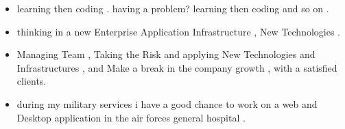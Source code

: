 \documentclass[10pt,a4paper]{altacv}
\begin{document}

\begin{fullwidth}
\makecvheader
\end{fullwidth}


\begin{itemize}
\item learning then coding . having a problem? learning then coding and so on .
\end{itemize}
\divider

\begin{itemize}
\item thinking in a new Enterprise Application Infrastructure , New Technologies .
\end{itemize}

\divider

\begin{itemize}
\item Managing Team , Taking the Risk and applying New Technologies and Infrastructures , and Make a break in the company growth , with a satisfied clients.
\end{itemize}

\divider

\begin{itemize}
\item 
during my military services i have a good chance to work on a web and Desktop application in the air forces general hospital . 
\end{itemize}
\end{document}
